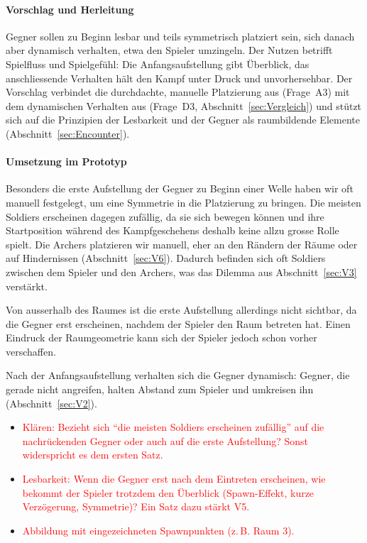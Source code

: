 \documentclass[../Main.tex]{subfiles}
\begin{document}
\paragraph{Vorschlag und Herleitung}
Gegner sollen zu Beginn lesbar und teils symmetrisch platziert sein, sich danach aber dynamisch verhalten, etwa den Spieler umzingeln. Der Nutzen betrifft Spielfluss und Spielgefühl: Die Anfangsaufstellung gibt Überblick, das anschliessende Verhalten hält den Kampf unter Druck und unvorhersehbar. Der Vorschlag verbindet die durchdachte, manuelle Platzierung aus  (Frage~A3) mit dem dynamischen Verhalten aus  (Frage~D3, Abschnitt~\ref{sec:Vergleich}) und stützt sich auf die Prinzipien der Lesbarkeit und der Gegner als raumbildende Elemente (Abschnitt~\ref{sec:Encounter}).

\paragraph{Umsetzung im Prototyp}
Besonders die erste Aufstellung der Gegner zu Beginn einer Welle haben wir oft manuell festgelegt, um eine Symmetrie in die Platzierung zu bringen. Die meisten Soldiers erscheinen dagegen zufällig, da sie sich bewegen können und ihre Startposition während des Kampfgeschehens deshalb keine allzu grosse Rolle spielt. Die Archers platzieren wir manuell, eher an den Rändern der Räume oder auf Hindernissen (Abschnitt~\ref{sec:V6}). Dadurch befinden sich oft Soldiers zwischen dem Spieler und den Archers, was das Dilemma aus Abschnitt~\ref{sec:V3} verstärkt.

Von ausserhalb des Raumes ist die erste Aufstellung allerdings nicht sichtbar, da die Gegner erst erscheinen, nachdem der Spieler den Raum betreten hat. Einen Eindruck der Raumgeometrie kann sich der Spieler jedoch schon vorher verschaffen.

Nach der Anfangsaufstellung verhalten sich die Gegner dynamisch: Gegner, die gerade nicht angreifen, halten Abstand zum Spieler und umkreisen ihn (Abschnitt~\ref{sec:V2}).

\begin{itemize}[leftmargin=1.5cm]
    \item \textcolor{red}{Klären: Bezieht sich \enquote{die meisten Soldiers erscheinen zufällig} auf die nachrückenden Gegner oder auch auf die erste Aufstellung? Sonst widerspricht es dem ersten Satz.}
    \item \textcolor{red}{Lesbarkeit: Wenn die Gegner erst nach dem Eintreten erscheinen, wie bekommt der Spieler trotzdem den Überblick (Spawn-Effekt, kurze Verzögerung, Symmetrie)? Ein Satz dazu stärkt V5.}
    \item \textcolor{red}{Abbildung mit eingezeichneten Spawnpunkten (z.\,B. Raum 3).}
\end{itemize}
\end{document}
